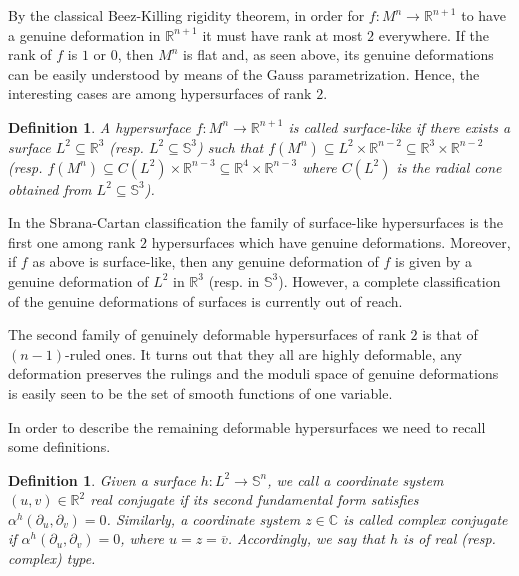 \documentclass{article}
\newtheorem{defn}[thm]{Definition}
\theoremstyle{remark}
\begin{document}
\text{ }

By the classical Beez-Killing rigidity theorem, in order for $f:M^n\rightarrow\mathbb{R}^{n+1}$ to have a genuine deformation in $\mathbb{R}^{n+1}$ it must have rank at most $2$ everywhere. If the rank of $f$ is $1$ or $0$, then $M^n$ is flat and, as seen above, its genuine deformations can be easily understood by means of the Gauss parametrization. Hence, the interesting cases are among hypersurfaces of rank $2$. 

\begin{defn}
    \normalfont A hypersurface $f:M^n\rightarrow\mathbb{R}^{n+1}$ is called {\it surface-like} if there exists a surface $L^2\subseteq\mathbb{R}^3$ (resp. $L^2\subseteq\mathbb{S}^3$) such that $f(M^n)\subseteq L^2\times\mathbb{R}^{n-2}\subseteq\mathbb{R}^3\times\mathbb{R}^{n-2}$ (resp. $f(M^n)\subseteq C(L^2)\times\mathbb{R}^{n-3}\subseteq\mathbb{R}^4\times\mathbb{R}^{n-3}$ where $C(L^2)$ is the radial cone obtained from $L^2\subseteq\mathbb{S}^3$).
\end{defn}

In the Sbrana-Cartan classification the family of surface-like hypersurfaces is the first one among rank $2$ hypersurfaces which have genuine deformations.
Moreover, if $f$ as above is surface-like, then any genuine deformation of $f$ is given by a genuine deformation of $L^2$ in $\mathbb{R}^3$ (resp. in $\mathbb{S}^3$). However, a complete classification of the genuine deformations of surfaces is currently out of reach. 

The second family of genuinely deformable hypersurfaces of rank $2$ is that of $(n-1)$-ruled ones. It turns out that they all are highly deformable, any deformation preserves the rulings and the moduli space of genuine deformations is easily seen to be the set of smooth functions of one variable.

In order to describe the remaining  deformable hypersurfaces we need to recall some definitions.

\begin{defn}
    \normalfont Given a surface $h:L^2\rightarrow\mathbb{S}^n$, we call a coordinate system $(u,v)\in\mathbb{R}^2$ {\it real conjugate} if its second fundamental form satisfies $\alpha^h(\partial_u,\partial_v)=0$. Similarly, a coordinate system $z\in\mathbb{C}$ is called {\it complex conjugate} if $\alpha^h(\partial_u,\partial_{v})=0$, where $u=z=\overline{v}$. Accordingly, we say that $h$ is of {\it real} (resp. {\it complex}) {\it type}.
\end{defn}
\end{document}
